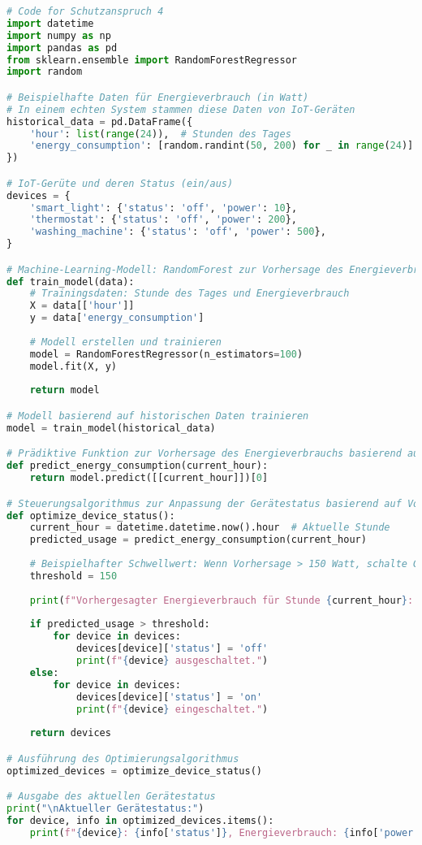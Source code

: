 {}
\begin{lstlisting}[language=python,caption=Code für Schutzanspruch 4, label=lst:schutz4]
# Code for Schutzanspruch 4
import datetime
import numpy as np
import pandas as pd
from sklearn.ensemble import RandomForestRegressor
import random

# Beispielhafte Daten für Energieverbrauch (in Watt)
# In einem echten System stammen diese Daten von IoT-Geräten
historical_data = pd.DataFrame({
    'hour': list(range(24)),  # Stunden des Tages
    'energy_consumption': [random.randint(50, 200) for _ in range(24)]  # Zufälliger Energieverbrauch
})

# IoT-Gerüte und deren Status (ein/aus)
devices = {
    'smart_light': {'status': 'off', 'power': 10},
    'thermostat': {'status': 'off', 'power': 200},
    'washing_machine': {'status': 'off', 'power': 500},
}

# Machine-Learning-Modell: RandomForest zur Vorhersage des Energieverbrauchs
def train_model(data):
    # Trainingsdaten: Stunde des Tages und Energieverbrauch
    X = data[['hour']]
    y = data['energy_consumption']
    
    # Modell erstellen und trainieren
    model = RandomForestRegressor(n_estimators=100)
    model.fit(X, y)
    
    return model

# Modell basierend auf historischen Daten trainieren
model = train_model(historical_data)

# Prädiktive Funktion zur Vorhersage des Energieverbrauchs basierend auf der aktuellen Stunde
def predict_energy_consumption(current_hour):
    return model.predict([[current_hour]])[0]

# Steuerungsalgorithmus zur Anpassung der Gerätestatus basierend auf Vorhersagen
def optimize_device_status():
    current_hour = datetime.datetime.now().hour  # Aktuelle Stunde
    predicted_usage = predict_energy_consumption(current_hour)
    
    # Beispielhafter Schwellwert: Wenn Vorhersage > 150 Watt, schalte Geräte aus
    threshold = 150
    
    print(f"Vorhergesagter Energieverbrauch für Stunde {current_hour}: {predicted_usage:.2f} Watt")
    
    if predicted_usage > threshold:
        for device in devices:
            devices[device]['status'] = 'off'
            print(f"{device} ausgeschaltet.")
    else:
        for device in devices:
            devices[device]['status'] = 'on'
            print(f"{device} eingeschaltet.")
    
    return devices

# Ausführung des Optimierungsalgorithmus
optimized_devices = optimize_device_status()

# Ausgabe des aktuellen Gerätestatus
print("\nAktueller Gerätestatus:")
for device, info in optimized_devices.items():
    print(f"{device}: {info['status']}, Energieverbrauch: {info['power']} Watt")

\end{lstlisting}

